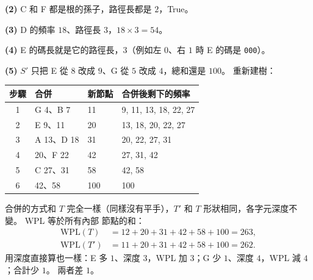\begin{pastsoln}
\textbf{(2)} C 和 F 都是根的孫子，路徑長都是 $2$，True。

\textbf{(3)} D 的頻率 $18$、路徑長 $3$，$18 \times 3 = 54$。

\textbf{(4)} E 的碼長就是它的路徑長，$3$（例如左 $0$、右 $1$ 時 E 的碼是 \texttt{000}）。

\textbf{(5)} $S'$ 只把 E 從 $8$ 改成 $9$、G 從 $5$ 改成 $4$，總和還是 $100$。 重新建樹：
\begin{center}
\small
\begin{tabular}{clll}
\toprule
步驟 & 合併 & 新節點 & 合併後剩下的頻率 \\
\midrule
1 & G 4、B 7 & 11 & 9, 11, 13, 18, 22, 27 \\
2 & E 9、11 & 20 & 13, 18, 20, 22, 27 \\
3 & A 13、D 18 & 31 & 20, 22, 27, 31 \\
4 & 20、F 22 & 42 & 27, 31, 42 \\
5 & C 27、31 & 58 & 42, 58 \\
6 & 42、58 & 100 & 100 \\
\bottomrule
\end{tabular}
\end{center}
合併的方式和 $T$ 完全一樣（同樣沒有平手），$T'$ 和 $T$ 形狀相同，各字元深度不變。 WPL 等於所有內部
節點的和：
\[
\begin{aligned}
\mathrm{WPL}(T) &= 12 + 20 + 31 + 42 + 58 + 100 = 263, \\
\mathrm{WPL}(T') &= 11 + 20 + 31 + 42 + 58 + 100 = 262 .
\end{aligned}
\]
用深度直接算也一樣：E 多 $1$、深度 $3$，WPL 加 $3$；G 少 $1$、深度 $4$，WPL 減 $4$；合計少 $1$。
兩者差 $1$。
\end{pastsoln}
